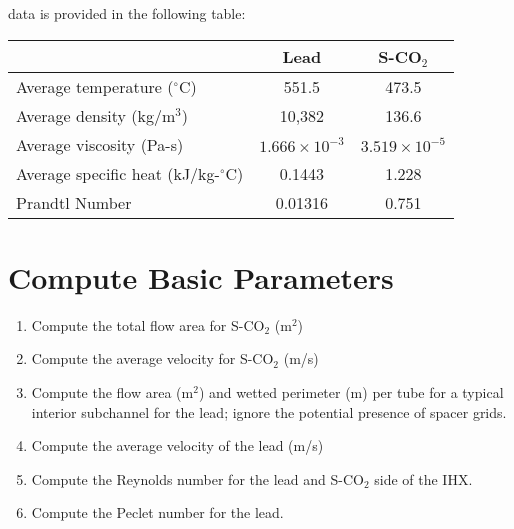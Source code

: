 \begin{fullwidth}
 data is provided in the following table:
\begin{table}
\begin{tabular}{l | c | c}
\toprule
  &  \textbf{Lead} & \textbf{S-CO$_2$} \\
\hline
Average temperature ($^{\circ}$C) & 551.5 & 473.5 \\
Average density (kg/m$^3$) & 10,382 & 136.6 \\
Average viscosity (Pa-s) & $1.666\times10^{-3}$ & $3.519 \times 10^{-5}$ \\
Average specific heat (kJ/kg-$^{\circ}$C) & 0.1443 & 1.228 \\
Prandtl Number & 0.01316 & 0.751 \\ 
\bottomrule
\end{tabular}
\end{table}

\section{Compute Basic Parameters}
\begin{enumerate}
\item Compute the total flow area for S-CO$_2$ (m$^2$)

\vspace{1.0 cm}

\item Compute the average velocity for S-CO$_2$ (m/s)

\vspace{1.0 cm}

\item Compute the flow area (m$^2$) and wetted perimeter (m) per tube for a typical interior subchannel for the lead; ignore the potential presence of spacer grids.

\vspace{1.0 cm}

\item Compute the average velocity of the lead (m/s)

\vspace{1.0 cm}

\item Compute the Reynolds number for the lead and S-CO$_2$ side of the IHX.

\vspace{1.0cm}

\item Compute the Peclet number for the lead.

\vspace{1.0 cm}


\end{enumerate}
\end{fullwidth}
